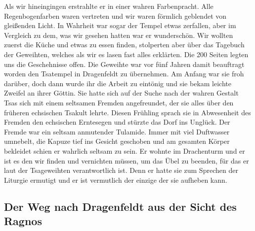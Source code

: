 Als wir hineingingen erstrahlte er in einer wahren Farbenpracht. Alle Regenbogenfarben waren vertreten und wir waren förmlich geblendet von gleißenden Licht. In Wahrheit war sogar der Tempel etwas zerfallen, aber im Vergleich zu dem, was wir gesehen hatten war er wunderschön. Wir wollten zuerst die Küche und etwas zu essen finden, stolperten aber über das Tagebuch der Geweihten, welches als wir es lasen fast alles erklärten. Die 200 Seiten legten uns die Geschehnisse offen. Die Geweihte war vor fünf Jahren damit beauftragt worden den Tsatempel in Dragenfeldt  zu übernehmen. Am Anfang war sie froh darüber, doch dann wurde ihr die Arbeit zu eintönig und sie bekam leichte Zweifel an ihrer Göttin. Sie hatte sich auf der Suche nach der wahren Gestalt Tsas sich mit einem seltsamen Fremden angefreundet, der sie alles über den früheren echsischen Tsakult lehrte. Diesen Frühling sprach sie in Abwesenheit des Fremden den echsischen Erntesegen und stürzte das Dorf ins Unglück. Der Fremde war ein seltsam anmutender Tulamide. Immer mit viel Duftwasser umnebelt, die Kapuze tief ins Gesicht geschoben und am gesamten Körper bekleidet schien er wahrlich seltsam zu sein. Er wohnte im Drachenturm und er ist es den wir finden und vernichten müssen, um das Übel zu beenden, für das er laut der Tsageweihten verantwortlich ist. Denn er hatte sie zum Sprechen der Liturgie ermutigt und er ist vermutlich der einzige der sie aufheben kann.

\subsection{Der Weg nach Dragenfeldt aus der Sicht des Ragnos}

